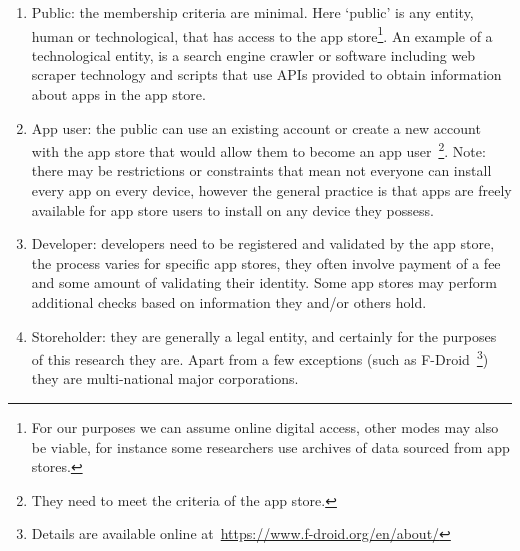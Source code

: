 \begin{enumerate}
    \item Public: the membership criteria are minimal. Here `public' is any entity, human or technological, that has access to the app store\footnote{For our purposes we can assume online digital access, other modes may also be viable, for instance some researchers use archives of data sourced from app stores.}. An example of a technological entity, is a search engine crawler or software including web scraper technology and scripts that use APIs provided to obtain information about apps in the app store.
    \item App user: the public can use an existing account or create a new account with the app store that would allow them to become an app user~\footnote{They need to meet the criteria of the app store.}. Note: there may be restrictions or constraints that mean not everyone can install every app on every device, however the general practice is that apps are freely available for app store users to install on any device they possess. 
    \item Developer: developers need to be registered and validated by the app store, the process varies for specific app stores, they often involve payment of a fee and some amount of validating their identity. Some app stores may perform additional checks based on information they and/or others hold.  
    \item Storeholder: they are generally a legal entity, and certainly for the purposes of this research they are. Apart from a few exceptions (such as F-Droid~\footnote{Details are available online at~\url{https://www.f-droid.org/en/about/}}) they are multi-national major corporations.
\end{enumerate}


